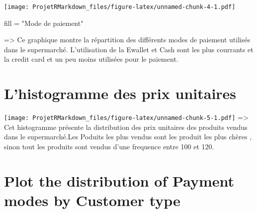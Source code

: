 \documentclass[
]{article}
\newenvironment{Shaded}{\begin{snugshade}}{\end{snugshade}}
\newcommand{\AttributeTok}[1]{\textcolor[rgb]{0.13,0.29,0.53}{#1}}
\newcommand{\FunctionTok}[1]{\textcolor[rgb]{0.13,0.29,0.53}{\textbf{#1}}}
\newcommand{\NormalTok}[1]{#1}
\newcommand{\OtherTok}[1]{\textcolor[rgb]{0.56,0.35,0.01}{#1}}
\newcommand{\SpecialCharTok}[1]{\textcolor[rgb]{0.81,0.36,0.00}{\textbf{#1}}}
\newcommand{\StringTok}[1]{\textcolor[rgb]{0.31,0.60,0.02}{#1}}
\begin{document}
\texttt{[image: ProjetRMarkdown\_files/figure-latex/unnamed-chunk-4-1.pdf]}

\begin{Shaded}
\begin{Highlighting}[]
\NormalTok{      fill }\OtherTok{=} \StringTok{"Mode de paiement"}
\end{Highlighting}
\end{Shaded}

=\textgreater{} Ce graphique montre la répartition des différents modes
de paiement utilisés dans le supermarché. L'utilisation de la Ewallet et
Cash sont les plus courrants et la credit card et un peu moins utilisées
pour le paiement.

\hypertarget{lhistogramme-des-prix-unitaires}{%
\section{L'histogramme des prix
unitaires}\label{lhistogramme-des-prix-unitaires}}

\begin{Shaded}
\end{Shaded}

\texttt{[image: ProjetRMarkdown\_files/figure-latex/unnamed-chunk-5-1.pdf]}
=\textgreater{} Cet histogramme présente la distribution des prix
unitaires des produits vendus dans le supermarché.Les Poduits les plus
vendus sont les produit les plus chères , sinon tout les produits sont
vendus d'une frequence entre 100 et 120.

\hypertarget{plot-the-distribution-of-payment-modes-by-customer-type}{%
\section{Plot the distribution of Payment modes by Customer
type}\label{plot-the-distribution-of-payment-modes-by-customer-type}}
\end{document}
